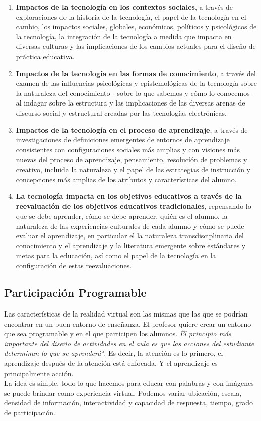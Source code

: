 \begin{enumerate}
	\item \textbf{Impactos de la tecnología en los contextos sociales}, a través de exploraciones de la historia de la tecnología, el papel de la tecnología en el cambio, los impactos sociales, globales, económicos, políticos y psicológicos de la tecnología, la integración de la tecnología a medida que impacta en diversas culturas y las implicaciones de los cambios actuales para el diseño de práctica educativa.
	\item \textbf{Impactos de la tecnología en las formas de conocimiento}, a través del examen de las influencias psicológicas y epistemológicas de la tecnología sobre la naturaleza del conocimiento - sobre lo que sabemos y cómo lo conocemos - al indagar sobre la estructura y las implicaciones de las diversas arenas de discurso social y estructural creadas por las tecnologías electrónicas.
	\item \textbf{Impactos de la tecnología en el proceso de aprendizaje}, a través de investigaciones de definiciones emergentes de entornos de aprendizaje consistentes con configuraciones sociales más amplias y con visiones más nuevas del proceso de aprendizaje, pensamiento, resolución de problemas y creativo, incluida la naturaleza y el papel de las estrategias de instrucción y concepciones más amplias de los atributos y características del alumno.
	\item \textbf{La tecnología impacta en los objetivos educativos a través de la reevaluación de los objetivos educativos tradicionales}, repensando lo que se debe aprender, cómo se debe aprender, quién es el alumno, la naturaleza de las experiencias culturales de cada alumno y cómo se puede evaluar el aprendizaje, en particular el la naturaleza transdisciplinaria del conocimiento y el aprendizaje y la literatura emergente sobre estándares y metas para la educación, así como el papel de la tecnología en la configuración de estas reevaluaciones.
\end{enumerate}

\subsection{Participación Programable}
Las características de la realidad virtual son las mismas que las que se podrían encontrar en un buen entorno de enseñanza. El profesor quiere crear un entorno que sea programable y en el que 
participen los alumnos. \textit{\"El principio más importante del diseño de actividades en el aula es que las acciones del estudiante determinan lo que se aprenderá".} 
Es decir, la atención es lo primero, el aprendizaje después de la atención está enfocada. Y el aprendizaje es principalmente acción.\\ 
La idea es simple, todo lo que hacemos para educar con palabras y con imágenes se puede brindar como experiencia virtual. Podemos variar ubicación, escala, densidad de información, 
interactividad y capacidad de respuesta, tiempo, grado de participación.\\

